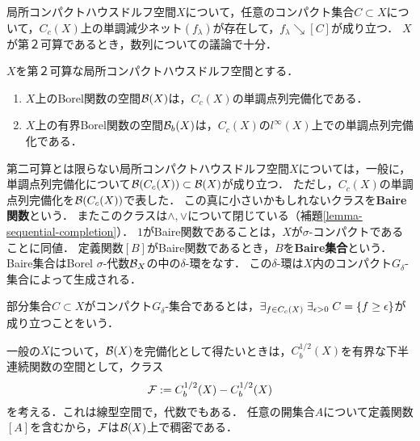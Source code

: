 \documentclass[uplatex,dvipdfmx]{jsreport}
\begin{document}
\begin{lemma}[コンパクト集合の定義関数の近似]
    局所コンパクトハウスドルフ空間$X$について，任意のコンパクト集合$C\subset X$について，$C_c(X)$上の単調減少ネット$(f_\lambda)$が存在して，$f_\lambda\searrow[C]$が成り立つ．
    $X$が第２可算であるとき，数列についての議論で十分．
\end{lemma}

\begin{proposition}
    $X$を第２可算な局所コンパクトハウスドルフ空間とする．
    \begin{enumerate}
        \item $X$上のBorel関数の空間$\mathcal{B}(X)$は，$C_c(X)$の単調点列完備化である．
        \item $X$上の有界Borel関数の空間$\mathcal{B}_b(X)$は，$C_c(X)$の$l^\infty(X)$上での単調点列完備化である．
    \end{enumerate}
\end{proposition}

\begin{remark}\label{remark-Baire-function}
    第二可算とは限らない局所コンパクトハウスドルフ空間$X$については，一般に，単調点列完備化について$\mathcal{B}(C_c(X))\subset\mathcal{B}(X)$が成り立つ．
    ただし，$C_c(X)$の単調点列完備化を$\mathcal{B}(C_c(X))$で表した．
    この真に小さいかもしれないクラスを\textbf{Baire関数}という．
    またこのクラスは$\land,\lor$について閉じている（補題\ref{lemma-sequential-completion}）．
    $1$がBaire関数であることは，$X$が$\sigma$-コンパクトであることに同値．
    定義関数$[B]$がBaire関数であるとき，$B$を\textbf{Baire集合}という．
    Baire集合はBorel $\sigma$-代数$\mathcal{B}_X$の中の$\delta$-環をなす．
    この$\delta$-環は$X$内のコンパクト$G_\delta$-集合によって生成される．
\end{remark}

\begin{definition}
    部分集合$C\subset X$がコンパクト$G_\delta$-集合であるとは，$\exists_{f\in C_c(X)}\;\exists_{\epsilon>0}\;C=\{f\ge \epsilon\}$が成り立つことをいう．
\end{definition}

\begin{remark}[Borel関数の空間の得方]
    一般の$X$について，$\mathcal{B}(X)$を完備化として得たいときは，$C^{1/2}_b(X)$を有界な下半連続関数の空間として，クラス
    \[\mathcal{F}:=C^{1/2}_b(X)-C^{1/2}_b(X)\]
    を考える．これは線型空間で，代数でもある．
    任意の開集合$A$について定義関数$[A]$を含むから，$\mathcal{F}$は$\mathcal{B}(X)$上で稠密である．
\end{remark}
\end{document}
